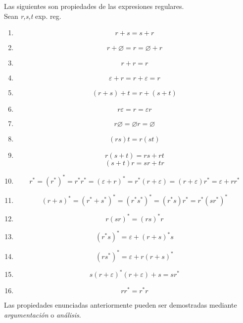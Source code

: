 \newpage
Las siguientes son propiedades de las expresiones regulares.\\
Sean \textit{r,s,t} exp. reg.
\begin{enumerate}
  \item \[r + s = s + r\]
  \item \[r + \varnothing = r = \varnothing + r\]
  \item \[ r + r = r\]
  \item \[\varepsilon + r = r + \varepsilon = r\]
  \item \[(r + s) + t = r + (s + t)\]
  \item \[r \varepsilon = r = \varepsilon r\]
  \item \[r \varnothing = \varnothing r = \varnothing\]
  \item \[(rs)t = r(st)\]
  \item \[r(s + t) = rs + rt\] \[(s + t)r = sr + tr\]
  \item \[r^* = (r^*)^* = r^* r^* = (\varepsilon + r)^* = r^*(r + \varepsilon) = (r + \varepsilon)r^* = \varepsilon + rr^*\]
  \item \[(r + s)^* = (r^* + s^*)^* = (r^*s^*)^* = (r^*s)r^* = r^*(sr^*)^*\]
  \item \[r(sr)^* = (rs)^*r\]
  \item \[(r^*s)^* = \varepsilon + (r + s)^*s\]
  \item \[(r s^*)^* = \varepsilon + r(r + s)^*\]
  \item \[s(r + \varepsilon)^* (r + \varepsilon) + s = s r^*\]
  \item \[rr^* = r^*r\]
\end{enumerate}

Las propiedades enunciadas anteriormente pueden ser demostradas mediante \textit{argumentación} o \textit{análisis}.
